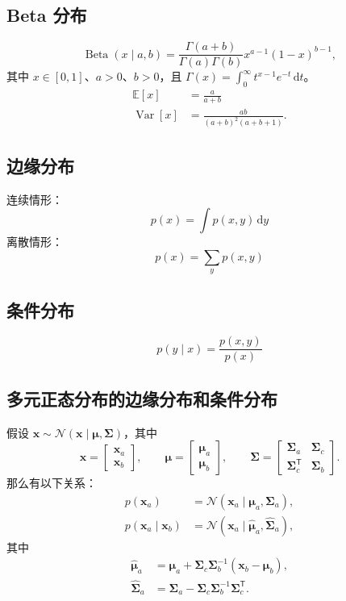 \subsection{Beta 分布}
\[
\operatorname{Beta}(x\mid a,b)=\frac{\Gamma(a+b)}{\Gamma(a)\Gamma(b)}
                             x^{a-1}(1-x)^{b-1},
\]
其中 $x\in[0,1]$、$a>0$、$b>0$，且 $\Gamma(x)=\int_0^\infty t^{x-1}e^{-t}\,\mathrm{d}t$。
\[
\begin{aligned}
\mathbb{E}[x]&=\frac{a}{a+b}\\
\operatorname{Var}[x]&=\frac{ab}{(a+b)^2(a+b+1)}.
\end{aligned}
\]

\subsection{边缘分布}
连续情形：
\[
p(x)=\int p(x,y)\,\mathrm{d}y
\]
离散情形：
\[
p(x)=\sum_y p(x,y)
\]

\subsection{条件分布}
\[
p(y\mid x)=\frac{p(x,y)}{p(x)}
\]

\subsection{多元正态分布的边缘分布和条件分布}
假设 $\mathbf{x}\sim\mathcal{N}(\mathbf{x}\mid\boldsymbol{\mu},\boldsymbol{\Sigma})$，其中
\[
\mathbf{x}=\begin{bmatrix}\mathbf{x}_a\\\mathbf{x}_b\end{bmatrix},
\qquad
\boldsymbol{\mu}=\begin{bmatrix}\boldsymbol{\mu}_a\\\boldsymbol{\mu}_b\end{bmatrix},
\qquad
\boldsymbol{\Sigma}
=\begin{bmatrix}\boldsymbol{\Sigma}_a&\boldsymbol{\Sigma}_c\\
                \boldsymbol{\Sigma}_c^{\mathsf T}&\boldsymbol{\Sigma}_b\end{bmatrix}.
\]
那么有以下关系：
\[
\begin{aligned}
p(\mathbf{x}_a)&=\mathcal{N}(\mathbf{x}_a\mid\boldsymbol{\mu}_a,\boldsymbol{\Sigma}_a),\\
p(\mathbf{x}_a\mid\mathbf{x}_b)
 &=\mathcal{N}(\mathbf{x}_a\mid\hat{\boldsymbol{\mu}}_a,\hat{\boldsymbol{\Sigma}}_a),
\end{aligned}
\]
其中
\[
\begin{aligned}
\hat{\boldsymbol{\mu}}_a
 &=\boldsymbol{\mu}_a+\boldsymbol{\Sigma}_c\boldsymbol{\Sigma}_b^{-1}
   (\mathbf{x}_b-\boldsymbol{\mu}_b),\\
\hat{\boldsymbol{\Sigma}}_a
 &=\boldsymbol{\Sigma}_a-\boldsymbol{\Sigma}_c\boldsymbol{\Sigma}_b^{-1}
                                   \boldsymbol{\Sigma}_c^{\mathsf T}.
\end{aligned}
\]

